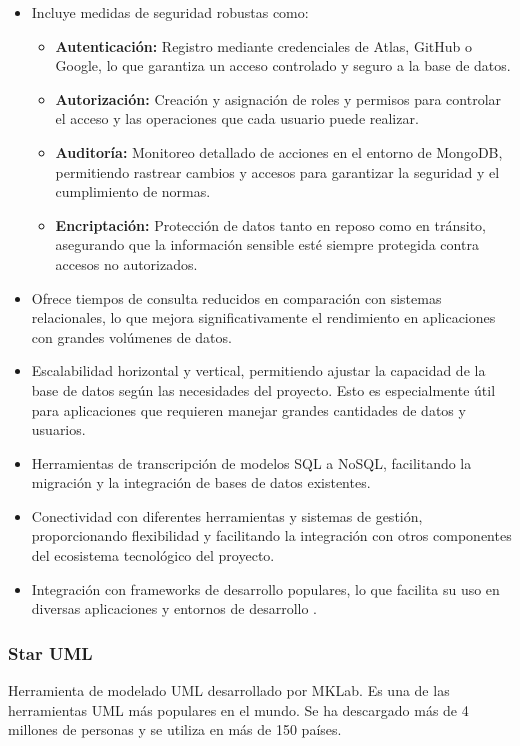 \documentclass[12pt,twoside]{article}
\begin{document}
	\begin{itemize}[noitemsep]
	\item Incluye medidas de seguridad robustas como:
		\begin{itemize}[noitemsep]
			\item \textbf{Autenticación:} Registro mediante credenciales de Atlas, GitHub o Google, lo que garantiza un acceso controlado y seguro a la base de datos.
			\item \textbf{Autorización:} Creación y asignación de roles y permisos para controlar el acceso y las operaciones que cada usuario puede realizar.
			\item \textbf{Auditoría:} Monitoreo detallado de acciones en el entorno de MongoDB, permitiendo rastrear cambios y accesos para garantizar la seguridad y el cumplimiento de normas.
			\item \textbf{Encriptación:} Protección de datos tanto en reposo como en tránsito, asegurando que la información sensible esté siempre protegida contra accesos no autorizados.
		\end{itemize}
	\item Ofrece tiempos de consulta reducidos en comparación con sistemas relacionales, lo que mejora significativamente el rendimiento en aplicaciones con grandes volúmenes de datos.
	\item Escalabilidad horizontal y vertical, permitiendo ajustar la capacidad de la base de datos según las necesidades del proyecto. Esto es especialmente útil para aplicaciones que requieren manejar grandes cantidades de datos y usuarios.
	\item Herramientas de transcripción de modelos SQL a NoSQL, facilitando la migración y la integración de bases de datos existentes.
	\item Conectividad con diferentes herramientas y sistemas de gestión, proporcionando flexibilidad y facilitando la integración con otros componentes del ecosistema tecnológico del proyecto.
	\item Integración con frameworks de desarrollo populares, lo que facilita su uso en diversas aplicaciones y entornos de desarrollo \cite{lan: mongo}.
\end{itemize}


	\subsubsection{Star UML}
	Herramienta de modelado UML desarrollado por MKLab. Es una de las herramientas UML más populares en el mundo. Se ha descargado más de 4 millones de personas y se utiliza en más de 150 países.
	
\end{document}
